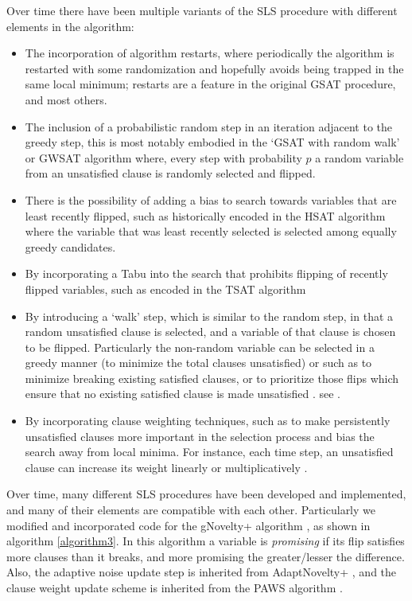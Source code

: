 \documentclass[
10pt, %
a4paper, %
oneside, %
headinclude,footinclude, %
BCOR5mm, %
]{scrartcl}
\begin{document}
Over time there have been multiple variants of the SLS procedure with different elements in the algorithm:
\begin{itemize}
\item	The incorporation of algorithm restarts, where periodically the algorithm is restarted with some randomization and hopefully avoids being trapped in the same local minimum; restarts are a feature in the original GSAT procedure, and most others.
\item	The inclusion of a probabilistic random step in an iteration adjacent to the greedy step, this is most notably embodied in the `GSAT with random walk' or GWSAT algorithm \cite{DBLP:conf/aaai/SelmanKC94} where, every step with probability $p$ a random variable from an unsatisfied clause is randomly selected and flipped.
\item	There is the possibility of adding a bias to search towards variables that are least recently flipped, such as historically encoded in the HSAT algorithm \cite{Gent:93AA} where the variable that was least recently selected is selected among equally greedy candidates.
\item	By incorporating a Tabu into the search that prohibits flipping of recently flipped variables, such as encoded in the TSAT algorithm \cite{DBLP:conf/aaai/MazureSG97}
\item	By introducing a `walk' step, which is similar to the random step, in that a random unsatisfied clause is selected, and a variable of that clause is chosen to be flipped.
Particularly the non-random variable can be selected in a greedy manner (to minimize the total clauses unsatisfied) or such as to minimize breaking existing satisfied clauses, or to prioritize those flips which ensure that no existing satisfied clause is made unsatisfied \cite{DBLP:conf/aaai/SelmanKC94}. see \cite{DBLP:conf/aaai/McAllesterSK97}.
\item	By incorporating clause weighting techniques, such as to make persistently unsatisfied clauses more important in the selection process and bias the search away from local minima. 
For instance, each time step, an unsatisfied clause can increase its weight linearly or multiplicatively \cite{DBLP:conf/aaai/ThorntonPBF04}.
\end{itemize}

Over time, many different SLS procedures have been developed and implemented, and many of their elements are compatible with each other.
Particularly we modified and incorporated code for the gNovelty+ algorithm \cite{DBLP:journals/jsat/PhamTGS08}, as shown in algorithm \ref{algorithm3}.
In this algorithm a variable is \textit{promising} if its flip satisfies more clauses than it breaks, and more promising the greater/lesser the difference.
Also, the adaptive noise update step is inherited from AdaptNovelty+ \cite{DBLP:conf/aaai/Hoos02}, and the clause weight update scheme is inherited from the PAWS algorithm \cite{DBLP:conf/aaai/ThorntonPBF04}.
\end{document}
